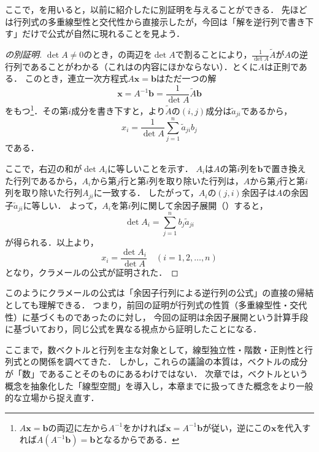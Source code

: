 ここで，を用いると，以前に紹介したに別証明を与えることができる．
先ほどは行列式の多重線型性と交代性から直接示したが，今回は「解を逆行列で書き下す」だけで公式が自然に現れることを見よう．

\begin{leftbar}
\begin{proof}[の別証明]
  $\det A \ne 0$のとき，の両辺を$\det A$で割ることにより，$\frac{1}{\det A}\tilde{A}$が$A$の逆行列であることがわかる（これはの内容にほかならない）．とくに$A$は正則である．
  このとき，連立一次方程式$A\bm{x} = \bm{b}$はただ一つの解
  \[
  \bm{x} = A^{-1}\bm{b} = \frac{1}{\det A}\tilde{A}\bm{b}
  \]
  をもつ\footnote{$A\bm{x} = \bm{b}$の両辺に左から$A^{-1}$をかければ$\bm{x} = A^{-1}\bm{b}$が従い，逆にこの$\bm{x}$を代入すれば$A(A^{-1}\bm{b}) = \bm{b}$となるからである．}．その第$i$成分を書き下すと，より$\tilde{A}$の$(i,j)$成分は$\tilde{a}_{ji}$であるから，
  \[
  x_i = \frac{1}{\det A}\sum_{j=1}^{n} \tilde{a}_{ji} b_j
  \]
  である．

  ここで，右辺の和が$\det A_i$に等しいことを示す．
  $A_i$は$A$の第$i$列を$\bm{b}$で置き換えた行列であるから，$A_i$から第$j$行と第$i$列を取り除いた行列は，$A$から第$j$行と第$i$列を取り除いた行列$A_{ji}$に一致する．
  したがって，$A_i$の$(j,i)$余因子は$A$の余因子$\tilde{a}_{ji}$に等しい．
  よって，$A_i$を第$i$列に関して余因子展開（）すると，
  \[
  \det A_i = \sum_{j=1}^{n} b_j \tilde{a}_{ji}
  \]
  が得られる．以上より，
  \[
  x_i = \frac{\det A_i}{\det A} \quad (i = 1, 2, \dots, n)
  \]
  となり，クラメールの公式が証明された．
\end{proof}
\end{leftbar}

このようにクラメールの公式は「余因子行列による逆行列の公式」の直接の帰結としても理解できる．
つまり，前回の証明が行列式の性質（多重線型性・交代性）に基づくものであったのに対し，
今回の証明は余因子展開という計算手段に基づいており，同じ公式を異なる視点から証明したことになる．

\bigskip

ここまで，数ベクトルと行列を主な対象として，線型独立性・階数・正則性と行列式との関係を調べてきた．
しかし，これらの議論の本質は，ベクトルの成分が「数」であることそのものにあるわけではない．
次章では，ベクトルという概念を抽象化した「線型空間」を導入し，本章までに扱ってきた概念をより一般的な立場から捉え直す．